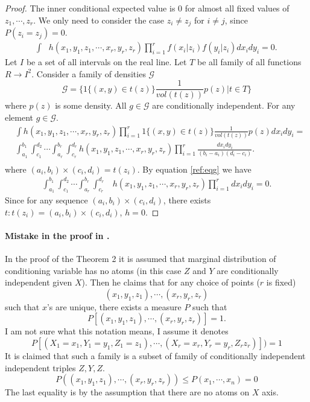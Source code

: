 \documentclass{article}
\begin{document}
\begin{proof}
The inner conditional expected value is 0 for almost all fixed values of $z_1, \cdots,z_r$. We only need to consider  the case   $z_i\neq z_j$ for $i\neq j$, since $P(z_i= z_j)=0$. 
\begin{align}
\label{ref:eqg}
 \int &h(x_1,y_1,z_1, \cdots, x_r,y_r,z_r)  \prod_{i=1}^{r} f(x_i|z_i)f(y_i|z_i) dx_i dy_i = 0.
\end{align}
Let $I$ be a set of all intervals on the real line. Let  $T$ be all family of all functions $R \to I^2$. Consider a family of densities $\mathcal G$
\[
 \mathcal G = \bigg \{ 1\{ (x,y) \in t(z) \}  \frac{1}{vol(t(z))} p(z) | t \in T \bigg \}
\]
where $p(z)$ is some density. All $g \in \mathcal G$ are conditionally independent. For any element $g \in \mathcal G$.
\begin{align}
&\int h(x_1,y_1,z_1, \cdots, x_r,y_r,z_r) \prod_{i=1}^{r} 1\{ (x,y) \in t(z) \}  \frac{1}{vol(t(z))} p(z)dx_i dy_i =\\ 
&\int_{a_1}^{b_1} \int_{c_1}^{d_2} \cdots \int_{a_r}^{b_r} \int_{c_r}^{d_r} h(x_1,y_1,z_1, \cdots, x_r,y_r,z_r) \prod_{i=1}^{r}  \frac{dx_i dy_i}{(b_i - a_i)(d_i-c_i) }. \\   
\end{align}
where $(a_i,b_i) \times (c_i,d_i) = t(z_i)$. 
By equation \ref{ref:eqg} we have 
\begin{align}
 \int_{a_1}^{b_1} \int_{c_1}^{d_2} \cdots \int_{a_r}^{b_r} \int_{c_r}^{d_r}& h(x_1,y_1,z_1, \cdots, x_r,y_r,z_r) \prod_{i=1}^{r}  dx_i dy_i = 0.
\end{align}
Since for any  sequence $ (a_i,b_i)\times (c_i,d_i) $, there exists  $t: t(z_i) = (a_i,b_i)\times (c_i,d_i) $, $h=0$. 
\end{proof}


\paragraph{Mistake in the proof in \cite{bergsma2004testing}.}
In the proof of the Theorem 2 it is assumed that marginal distribution of conditioning variable has no atoms (in this case $Z$ and $Y$ are  conditionally independent given $X$). Then he claims that for any choice of points ($r$ is fixed)
\[ (x_1 , y_1 , z_1 ), \cdots, (x_r , y_r , z_r ) \]  
such that $x$'s are unique, there exists a measure $P$ such that
\[
P[(x_1 , y_1 , z_1 ), \cdots , (x_r , y_r , z_r ) ] =1. 
\]
I am not sure what this notation  means, I assume it denotes 
\[
P[(X_1=x_1 ,Y_1= y_1 , Z_1=z_1 ), \cdots , (X_r = x_r , Y_r= y_r ,Z_r z_r ) ] ) =1
\]
It is claimed that such a family is a subset of family of conditionally independent independent triples $Z,Y,Z$.
\[
P( (x_1 , y_1 , z_1 ), \cdots , (x_r , y_r , z_r ) ) \leq  P(x_1,\cdots,x_n) =0
\]
The last equality is by the assumption that there are no atoms on $X$ axis.
\end{document}
